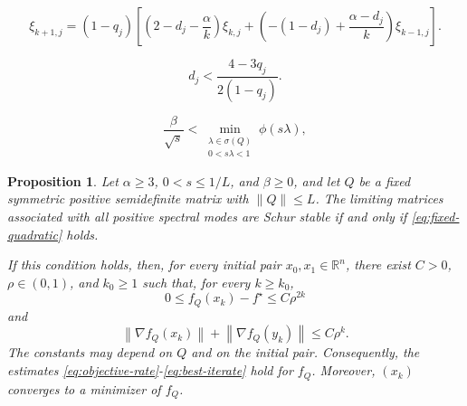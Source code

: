 \documentclass[10pt,a4paper]{amsart}
\newtheorem{proposition}{Proposition}
\newcommand{\R}{\mathbb{R}}
\newcommand{\norm}[1]{\left\lVert #1\right\rVert}
\begin{document}
\begin{equation}
\label{eq:quadratic-mode}
\xi_{k+1,j}=(1-q_j)
\left[
\left(2-d_j-\frac{\alpha}{k}\right)\xi_{k,j}
+\left(-(1-d_j)+\frac{\alpha-d_j}{k}\right)\xi_{k-1,j}
\right].
\end{equation}

\begin{equation}
\label{eq:exact-modal}
d_j<\frac{4-3q_j}{2(1-q_j)}.
\end{equation}

\begin{equation}
\label{eq:fixed-quadratic}
\frac{\beta}{\sqrt{s}}<
\min_{\substack{\lambda\in\sigma(Q)\\0<s\lambda<1}}
\phi(s\lambda),
\end{equation}

\begin{proposition}
\label{prop:fixed-quadratic}
Let $\alpha\geq3$, $0<s\leq1/L$, and $\beta\geq0$, and let $Q$ be a fixed
symmetric positive semidefinite matrix with $\norm{Q}\leq L$. The limiting
matrices associated with all positive spectral modes are Schur stable if and
only if \eqref{eq:fixed-quadratic} holds.

If this condition holds, then, for every initial pair $x_0,x_1\in\R^n$,
there exist $C>0$, $\rho\in(0,1)$, and $k_0\geq1$ such that, for every
$k\geq k_0$,
\begin{equation}
\label{eq:quadratic-geometric}
0\leq f_Q(x_k)-f^\star\leq C\rho^{2k}
\end{equation}
and
\begin{equation}
\label{eq:quadratic-gradient-geometric}
\norm{\nabla f_Q(x_k)}+\norm{\nabla f_Q(y_k)}
\leq C\rho^k.
\end{equation}
The constants may depend on $Q$ and on the initial pair.
Consequently, the estimates
\eqref{eq:objective-rate}-\eqref{eq:best-iterate} hold for $f_Q$.
Moreover, $(x_k)$ converges to a minimizer of $f_Q$.
\end{proposition}
\end{document}
